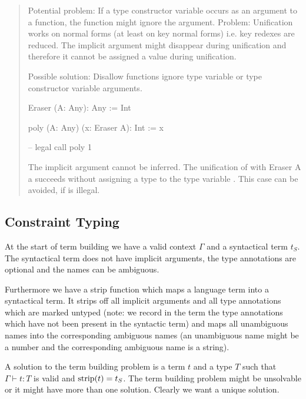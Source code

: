\begin{quote}
    Potential problem: If a type constructor variable occurs as an argument to a
    function, the function might ignore the argument. Problem: Unification works
    on normal forms (at least on key normal forms) i.e. key redexes are reduced.
    The implicit argument might disappear during unification and therefore it
    cannot be assigned a value during unification.

    Possible solution: Disallow functions ignore type variable or type
    constructor variable arguments.

    \begin{alba}
        Eraser (A: Any): Any := Int

        poly (A: Any) (x: Eraser A): Int := x

        -- legal call
        poly 1
    \end{alba}

    The implicit argument  cannot be inferred. The unification of
     with {Eraser A} a succeeds without assigning a type to the type
    variable . This case can be avoided, if  is illegal.

\end{quote}






\subsection{Constraint Typing}

At the start of term building we have a valid context $\Gamma$ and a syntactical
term $t_S$. The syntactical term does not have implicit arguments, the type
annotations are optional and the names can be ambiguous.

Furthermore we have a strip function which maps a language term into a
syntactical term. It strips off all implicit arguments and all type annotations
which are marked untyped (note: we record in the term the type annotations which
have not been present in the syntactic term) and maps all unambiguous names into
the corresponding ambiguous names (an unambiguous name might be a number and the
corresponding ambiguous name is a string).

A solution to the term building problem is a term $t$ and a type $T$ such that
$\Gamma \vdash t: T$ is valid and $\text{strip}(t) = t_S$. The term building problem
might be unsolvable or it might have more than one solution. Clearly we want a
unique solution.

